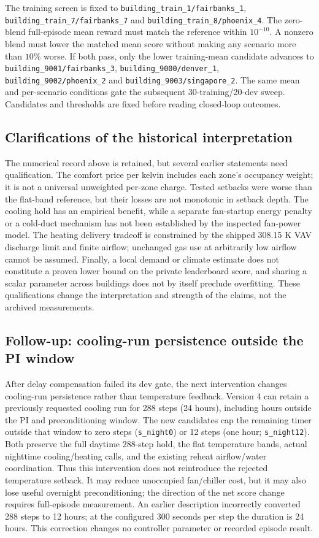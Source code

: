 The training screen is fixed to \texttt{building\_train\_1/fairbanks\_1},
\texttt{building\_train\_7/fairbanks\_7} and
\texttt{building\_train\_8/phoenix\_4}. The zero-blend full-episode mean
reward must match the reference within $10^{-10}$. A nonzero blend must
lower the matched mean score without making any scenario more than $10\%$
worse. If both pass, only the lower training-mean candidate advances to
\texttt{building\_9001/fairbanks\_3},
\texttt{building\_9000/denver\_1},
\texttt{building\_9002/phoenix\_2} and
\texttt{building\_9003/singapore\_2}. The same mean and per-scenario
conditions gate the subsequent 30-training/20-dev sweep. Candidates and
thresholds are fixed before reading closed-loop outcomes.



\subsection{Clarifications of the historical interpretation}
The numerical record above is retained, but several earlier statements need
qualification. The comfort price per kelvin includes each zone's occupancy
weight; it is not a universal unweighted per-zone charge. Tested setbacks
were worse than the flat-band reference, but their losses are not monotonic
in setback depth. The cooling hold has an empirical benefit, while a separate
fan-startup energy penalty or a cold-duct mechanism has not been established
by the inspected fan-power model. The heating delivery tradeoff is constrained
by the shipped 308.15 K VAV discharge limit and finite airflow; unchanged gas
use at arbitrarily low airflow cannot be assumed. Finally, a local demand or
climate estimate does not constitute a proven lower bound on the private
leaderboard score, and sharing a scalar parameter across buildings does not
by itself preclude overfitting. These qualifications change the interpretation
and strength of the claims, not the archived measurements.

\subsection{Follow-up: cooling-run persistence outside the PI window}
After delay compensation failed its dev gate, the next intervention changes
cooling-run persistence rather than temperature feedback. Version 4 can retain
a previously requested cooling run for 288 steps (24 hours), including hours
outside the PI and preconditioning window. The new candidates cap the remaining
timer outside that window to zero steps (\texttt{s\_night0}) or 12 steps
(one hour; \texttt{s\_night12}). Both preserve the full daytime 288-step hold,
the flat temperature bands, actual nighttime cooling/heating calls, and
the existing reheat airflow/water coordination. Thus this intervention does
not reintroduce the rejected temperature setback. It may reduce unoccupied
fan/chiller cost, but it may also lose useful overnight preconditioning;
the direction of the net score change requires full-episode measurement.
An earlier description incorrectly converted 288 steps to 12 hours; at the
configured 300 seconds per step the duration is 24 hours. This correction
changes no controller parameter or recorded episode result.

